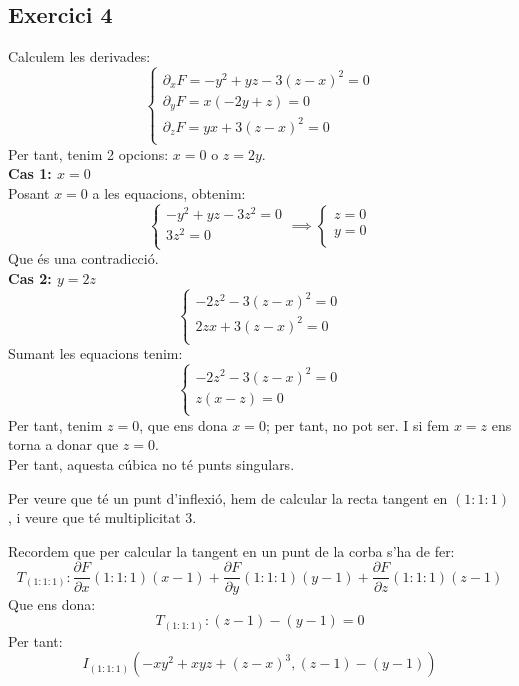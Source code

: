 \documentclass[11pt, a4paper]{article}
\begin{document}
\subsection{Exercici 4}
Calculem les derivades:
\[
    \begin{cases}
        \partial_xF=-y^2+yz-3(z-x)^2=0\\
        \partial_yF=x(-2y+z)=0\\
        \partial_zF=yx+3(z-x)^2=0\\
    \end{cases}
\]
Per tant, tenim 2 opcions: $x=0$ o $z=2y$.\\
\textbf{Cas 1: $x=0$}\\
Posant $x=0$ a les equacions, obtenim:
\[
    \begin{cases}
        -y^2+yz-3z^2=0\\
        3z^2=0\\
    \end{cases}\implies
    \begin{cases}
        z=0\\
        y=0\\
    \end{cases}
\]
Que és una contradicció.\\
\textbf{Cas 2: $y=2z$}\\
\[
    \begin{cases}
        -2z^2-3(z-x)^2=0\\
        2zx+3(z-x)^2=0\\
    \end{cases}
\]
Sumant les equacions tenim:
\[
    \begin{cases}
        -2z^2-3(z-x)^2=0\\
        z(x-z)=0\\
    \end{cases}
\]
Per tant, tenim $z=0$, que ens dona $x=0$; per tant, no pot ser. I si fem $x=z$ ens torna a donar que $z=0$.\\
Per tant, aquesta cúbica no té punts singulars.\par
Per veure que té un punt d'inflexió, hem de calcular la recta tangent en $(1:1:1)$, i veure que té multiplicitat 3.\par
Recordem que per calcular la tangent en un punt de la corba s'ha de fer:
\[
    T_{(1:1:1)}:\frac{\partial F}{\partial x}(1:1:1)(x-1) + \frac{\partial F}{\partial y}(1:1:1)(y-1) + \frac{\partial F}{\partial z}(1:1:1)(z-1)
\]
Que ens dona:
\[
    T_{(1:1:1)}:(z-1)-(y-1)=0
\]
Per tant:
\[
    I_{(1:1:1)}(-xy^2+xyz+(z-x)^3,(z-1)-(y-1))
\]
\end{document}
